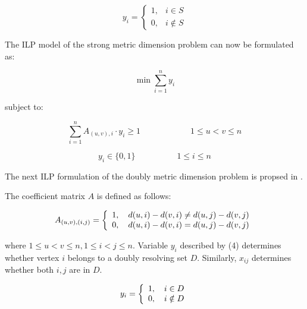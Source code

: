 \documentclass[preprint,12pt]{elsarticle}
\begin{document}
\begin{equation}
y_i  =\begin{cases}
1, & i \in S\\
0, & i \notin S
\end{cases}
\end{equation}

The ILP model of the strong metric dimension problem can now be
formulated as:

\begin{equation} \label{ilpsk}
\min \sum\limits_{i = 1}^n {y_i }
\end{equation}

subject to:

\begin{equation}
\sum\limits_{i = 1}^{n} {A_{(u,v),i} \cdot y_i}  \ge 1\quad \quad
\quad \quad \quad \quad 1 \le u < v \le n
\end{equation}


\begin{equation} \label{ilpsk2}
y_i  \in \{ 0,1\} \quad \quad \quad \quad \quad 1 \le i \le n
\end{equation}
 

The next ILP formulation of the doubly metric dimension problem is propsed in 
\cite{ilpd}. 

The coefficient matrix $A$ is defined as
follows:

\begin{equation} \label{ilpdp}
A_{(u,v),(i,j)}  = \left\{ {\begin{array}{*{20}c}
   {1,\quad d(u,i) - d(v,i) \ne d(u,j) - d(v,j)}  \\
   {0,\quad d(u,i) - d(v,i) = d(u,j) - d(v,j)}  \\
\end{array}} \right.
\end{equation}

where $1 \leq u < v \leq n, 1 \leq i < j \leq n$. Variable $y_i$ described by (4)
determines whether vertex $i$ belongs to a doubly resolving set $D$. Similarly,
$x_{ij}$ determines whether both $i,j$ are in $D$.

\begin{equation}
y_i  = \left\{ {\begin{array}{*{20}c}
   {1,\quad i \in D}  \\
   {0,\quad i \notin D}  \\
\end{array}} \right.
\end{equation}
\end{document}
